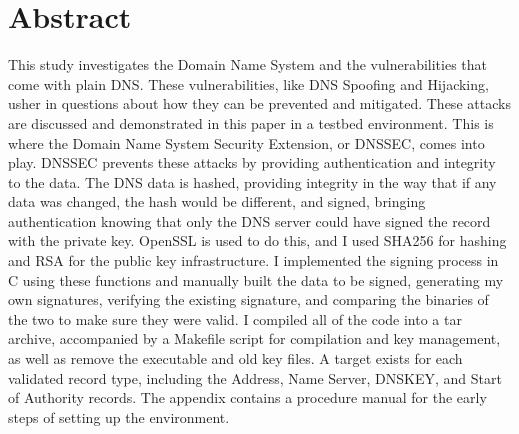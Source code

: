 \chapter*{Abstract}


This study investigates the Domain Name System and the vulnerabilities that come with plain DNS. 
These vulnerabilities, like DNS Spoofing and Hijacking, usher in questions about how they can 
be prevented and mitigated. These attacks are discussed and demonstrated in this paper in a testbed environment. This is 
where the Domain Name System Security Extension, or DNSSEC, comes into play. DNSSEC prevents 
these attacks by providing authentication and integrity to the data. The DNS data is hashed, 
providing integrity in the way that if any data was changed, the hash would be different, and signed, 
bringing authentication knowing that only the DNS server could have signed the record with the private key. 
OpenSSL is used to do this, and I used SHA256 for hashing and RSA for the public key infrastructure. 
I implemented the signing process in C using these functions and manually built the data to be signed, 
generating my own signatures, verifying the existing signature, and comparing the binaries of the two 
to make sure they were valid. I compiled all of the code into a tar archive, accompanied by a Makefile script 
for compilation and key management, as well as remove the executable and old key files. A target exists for 
each validated record type, including the Address, Name Server, DNSKEY, and Start of Authority records. 
The appendix contains a procedure manual for the early steps of setting up the environment.